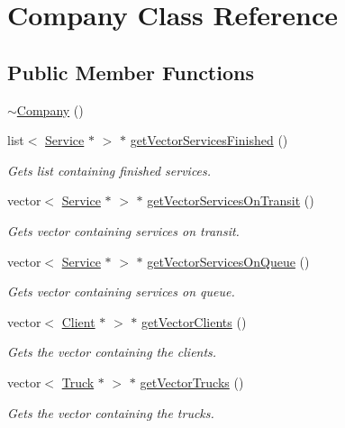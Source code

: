 \hypertarget{class_company}{}\section{Company Class Reference}
\label{class_company}
\subsection*{Public Member Functions}
\begin{DoxyCompactItemize}
\item 
\hyperlink{class_company_a61c2a9ec178e683310583ef15635b53c}{$\sim$\+Company} ()
\item 
list$<$ \hyperlink{class_service}{Service} $\ast$ $>$ $\ast$ \hyperlink{class_company_ab018a747472dbb17d07e85d17dc17912}{get\+Vector\+Services\+Finished} ()
\begin{DoxyCompactList}\small\item\em Gets list containing finished services. \end{DoxyCompactList}\item 
vector$<$ \hyperlink{class_service}{Service} $\ast$ $>$ $\ast$ \hyperlink{class_company_ab83ddbd16558f0e99efa7c56878e0ec8}{get\+Vector\+Services\+On\+Transit} ()
\begin{DoxyCompactList}\small\item\em Gets vector containing services on transit. \end{DoxyCompactList}\item 
vector$<$ \hyperlink{class_service}{Service} $\ast$ $>$ $\ast$ \hyperlink{class_company_adffe3680413d999c922858c88fbd18a6}{get\+Vector\+Services\+On\+Queue} ()
\begin{DoxyCompactList}\small\item\em Gets vector containing services on queue. \end{DoxyCompactList}\item 
vector$<$ \hyperlink{class_client}{Client} $\ast$ $>$ $\ast$ \hyperlink{class_company_a16693c2e4bf9a932e15926c37c21485f}{get\+Vector\+Clients} ()
\begin{DoxyCompactList}\small\item\em Gets the vector containing the clients. \end{DoxyCompactList}\item 
vector$<$ \hyperlink{class_truck}{Truck} $\ast$ $>$ $\ast$ \hyperlink{class_company_a78feb735977ce59f253a30082dbf24b6}{get\+Vector\+Trucks} ()
\begin{DoxyCompactList}\small\item\em Gets the vector containing the trucks. \end{DoxyCompactList}\item 

\end{DoxyCompactItemize}
